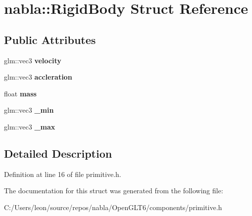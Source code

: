 \hypertarget{structnabla_1_1_rigid_body}{}\section{nabla\+::Rigid\+Body Struct Reference}
\label{structnabla_1_1_rigid_body}
\subsection*{Public Attributes}
\begin{DoxyCompactItemize}
\item 
\mbox{\label{structnabla_1_1_rigid_body_a5f67148fe4661a647ebb833673d77b76}} 
glm\+::vec3 {\bfseries velocity}
\item 
\mbox{\label{structnabla_1_1_rigid_body_abf2254add70525d194a79e411e24a21c}} 
glm\+::vec3 {\bfseries accleration}
\item 
\mbox{\label{structnabla_1_1_rigid_body_accd066bf3ef4adb9fc8a8ba45dd84eae}} 
float {\bfseries mass}
\item 
\mbox{\label{structnabla_1_1_rigid_body_a1e8783f7ae4cea7d2c4025fd8b8d4ac1}} 
glm\+::vec3 {\bfseries \+\_\+min}
\item 
\mbox{\label{structnabla_1_1_rigid_body_a654bf8a4d073f9b1441a76e85faa6627}} 
glm\+::vec3 {\bfseries \+\_\+max}
\end{DoxyCompactItemize}


\subsection{Detailed Description}


Definition at line 16 of file primitive.\+h.



The documentation for this struct was generated from the following file\+:\begin{DoxyCompactItemize}
\item 
C\+:/\+Users/leon/source/repos/nabla/\+Open\+G\+L\+T6/components/primitive.\+h\end{DoxyCompactItemize}
